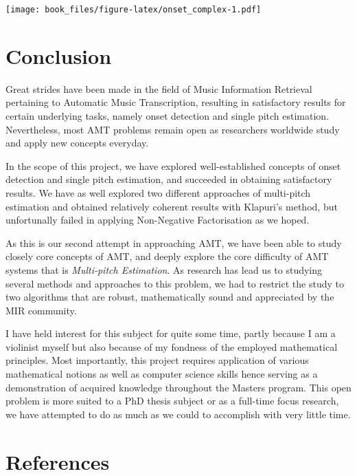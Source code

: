 \documentclass[american,]{article}
\begin{document}
\texttt{[image: book\_files/figure-latex/onset\_complex-1.pdf]}

\pagebreak

\hypertarget{conclusion}{%
\section{Conclusion}\label{conclusion}}

Great strides have been made in the field of Music Information
Retrieval pertaining to Automatic Music Transcription,
resulting in satisfactory results for certain underlying
tasks, namely onset detection and single pitch estimation.
Nevertheless, most AMT problems remain open as researchers
worldwide study and apply new concepts everyday.

In the scope of this project, we have explored well-established concepts
of onset detection and single pitch estimation, and succeeded in obtaining
satisfactory results.
We have as well explored two different approaches of multi-pitch estimation
and obtained relatively coherent results with Klapuri's method,
but unfortunally failed in applying Non-Negative Factorisation
as we hoped.

As this is our second attempt in approaching AMT,
we have been able to study closely core concepts of AMT,
and deeply explore the core difficulty of AMT systems
that is \emph{Multi-pitch Estimation}.
As research has lead us to studying several methods and approaches
to this problem, we had to restrict the study to two algorithms
that are robust, mathematically sound and appreciated by the MIR community.

I have held interest for this subject for quite some time,
partly because I am a violinist myself but also because
of my fondness of the employed mathematical principles.
Most importantly, this project requires application of various
mathematical notions as well as computer science skills
hence serving as a demonstration of acquired knowledge
throughout the Masters program.
This open problem is more suited to a PhD thesis subject or
as a full-time focus research, we have attempted to do as much
as we could to accomplish with very little time.

\pagebreak

\hypertarget{references}{%
\section*{References}\label{references}}
\end{document}
